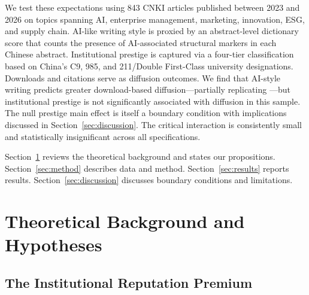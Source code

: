 \documentclass[12pt,a4paper]{article}
\begin{document}
We test these expectations using 843 CNKI articles published between
2023 and 2026 on topics spanning AI, enterprise management, marketing,
innovation, ESG, and supply chain.
AI-like writing style is proxied by an abstract-level dictionary score
that counts the presence of AI-associated structural markers in each
Chinese abstract.
Institutional prestige is captured via a four-tier classification
based on China's C9, 985, and 211/Double First-Class university
designations.
Downloads and citations serve as diffusion outcomes.
We find that AI-style writing predicts greater download-based
diffusion---partially replicating \citet{JoLi2026}---but institutional
prestige is not significantly associated with diffusion in this sample.
The null prestige main effect is itself a boundary condition with
implications discussed in Section~\ref{sec:discussion}.
The critical interaction is consistently small and statistically
insignificant across all specifications.

Section~\ref{sec:theory} reviews the theoretical background and states
our propositions.
Section~\ref{sec:method} describes data and method.
Section~\ref{sec:results} reports results.
Section~\ref{sec:discussion} discusses boundary conditions and limitations.

\section{Theoretical Background and Hypotheses}
\label{sec:theory}

\subsection{The Institutional Reputation Premium}
\end{document}
